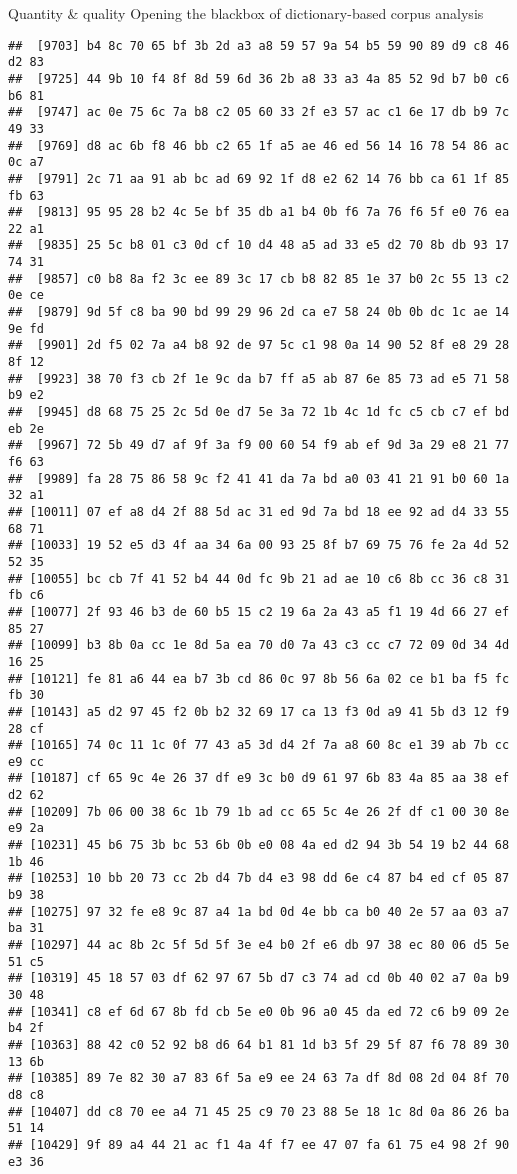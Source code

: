 \documentclass[
  ignorenonframetext,
]{beamer}
\begin{document}
\begin{frame}[fragile]{Quantity \& quality \textbar{} Opening the
blackbox of dictionary-based corpus analysis}
\begin{verbatim}
##  [9703] b4 8c 70 65 bf 3b 2d a3 a8 59 57 9a 54 b5 59 90 89 d9 c8 46 d2 83
##  [9725] 44 9b 10 f4 8f 8d 59 6d 36 2b a8 33 a3 4a 85 52 9d b7 b0 c6 b6 81
##  [9747] ac 0e 75 6c 7a b8 c2 05 60 33 2f e3 57 ac c1 6e 17 db b9 7c 49 33
##  [9769] d8 ac 6b f8 46 bb c2 65 1f a5 ae 46 ed 56 14 16 78 54 86 ac 0c a7
##  [9791] 2c 71 aa 91 ab bc ad 69 92 1f d8 e2 62 14 76 bb ca 61 1f 85 fb 63
##  [9813] 95 95 28 b2 4c 5e bf 35 db a1 b4 0b f6 7a 76 f6 5f e0 76 ea 22 a1
##  [9835] 25 5c b8 01 c3 0d cf 10 d4 48 a5 ad 33 e5 d2 70 8b db 93 17 74 31
##  [9857] c0 b8 8a f2 3c ee 89 3c 17 cb b8 82 85 1e 37 b0 2c 55 13 c2 0e ce
##  [9879] 9d 5f c8 ba 90 bd 99 29 96 2d ca e7 58 24 0b 0b dc 1c ae 14 9e fd
##  [9901] 2d f5 02 7a a4 b8 92 de 97 5c c1 98 0a 14 90 52 8f e8 29 28 8f 12
##  [9923] 38 70 f3 cb 2f 1e 9c da b7 ff a5 ab 87 6e 85 73 ad e5 71 58 b9 e2
##  [9945] d8 68 75 25 2c 5d 0e d7 5e 3a 72 1b 4c 1d fc c5 cb c7 ef bd eb 2e
##  [9967] 72 5b 49 d7 af 9f 3a f9 00 60 54 f9 ab ef 9d 3a 29 e8 21 77 f6 63
##  [9989] fa 28 75 86 58 9c f2 41 41 da 7a bd a0 03 41 21 91 b0 60 1a 32 a1
## [10011] 07 ef a8 d4 2f 88 5d ac 31 ed 9d 7a bd 18 ee 92 ad d4 33 55 68 71
## [10033] 19 52 e5 d3 4f aa 34 6a 00 93 25 8f b7 69 75 76 fe 2a 4d 52 52 35
## [10055] bc cb 7f 41 52 b4 44 0d fc 9b 21 ad ae 10 c6 8b cc 36 c8 31 fb c6
## [10077] 2f 93 46 b3 de 60 b5 15 c2 19 6a 2a 43 a5 f1 19 4d 66 27 ef 85 27
## [10099] b3 8b 0a cc 1e 8d 5a ea 70 d0 7a 43 c3 cc c7 72 09 0d 34 4d 16 25
## [10121] fe 81 a6 44 ea b7 3b cd 86 0c 97 8b 56 6a 02 ce b1 ba f5 fc fb 30
## [10143] a5 d2 97 45 f2 0b b2 32 69 17 ca 13 f3 0d a9 41 5b d3 12 f9 28 cf
## [10165] 74 0c 11 1c 0f 77 43 a5 3d d4 2f 7a a8 60 8c e1 39 ab 7b cc e9 cc
## [10187] cf 65 9c 4e 26 37 df e9 3c b0 d9 61 97 6b 83 4a 85 aa 38 ef d2 62
## [10209] 7b 06 00 38 6c 1b 79 1b ad cc 65 5c 4e 26 2f df c1 00 30 8e e9 2a
## [10231] 45 b6 75 3b bc 53 6b 0b e0 08 4a ed d2 94 3b 54 19 b2 44 68 1b 46
## [10253] 10 bb 20 73 cc 2b d4 7b d4 e3 98 dd 6e c4 87 b4 ed cf 05 87 b9 38
## [10275] 97 32 fe e8 9c 87 a4 1a bd 0d 4e bb ca b0 40 2e 57 aa 03 a7 ba 31
## [10297] 44 ac 8b 2c 5f 5d 5f 3e e4 b0 2f e6 db 97 38 ec 80 06 d5 5e 51 c5
## [10319] 45 18 57 03 df 62 97 67 5b d7 c3 74 ad cd 0b 40 02 a7 0a b9 30 48
## [10341] c8 ef 6d 67 8b fd cb 5e e0 0b 96 a0 45 da ed 72 c6 b9 09 2e b4 2f
## [10363] 88 42 c0 52 92 b8 d6 64 b1 81 1d b3 5f 29 5f 87 f6 78 89 30 13 6b
## [10385] 89 7e 82 30 a7 83 6f 5a e9 ee 24 63 7a df 8d 08 2d 04 8f 70 d8 c8
## [10407] dd c8 70 ee a4 71 45 25 c9 70 23 88 5e 18 1c 8d 0a 86 26 ba 51 14
## [10429] 9f 89 a4 44 21 ac f1 4a 4f f7 ee 47 07 fa 61 75 e4 98 2f 90 e3 36

\end{verbatim}
\end{frame}
\end{document}
